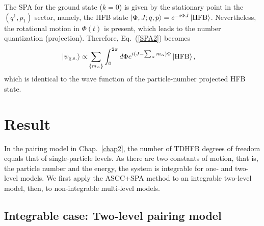 \documentclass[11pt]{book} %
\begin{document}
The SPA for the ground state ($k=0$) is given by the stationary point
in the $(q^1,p_1)$ sector,
namely, the HFB state $\ket{\Phi,J;q,p}=e^{-i\Phi\hat{J}}\ket{\rm HFB}$.
Nevertheless, the rotational motion in $\Phi(t)$ is present,
which leads to the number quantization (projection).
Therefore, Eq.~(\ref{SPA2}) becomes
\begin{align}
	\ket{\psi_{\rm g.s.}} \propto& \sum_{\{m_\alpha\}}
	\int_0^{2\pi} d\Phi e^{i(J-\sum_\alpha m_\alpha)\Phi}
	\ket{\rm HFB},  
	\label{SPA3}
\end{align}
which is identical to the wave function of the particle-number projected HFB state.


\section{Result}
\label{4-3}
In the pairing model in Chap.~\ref{chap2},
the number of TDHFB degrees of freedom equals that of single-particle levels.
As there are two constants of motion, that is, the particle number and 
the energy, the system is integrable for one- and two-level models.
We first apply the ASCC+SPA method to an integrable two-level model,
then, to non-integrable multi-level models.


\subsection{Integrable case: Two-level pairing model}
\end{document}
